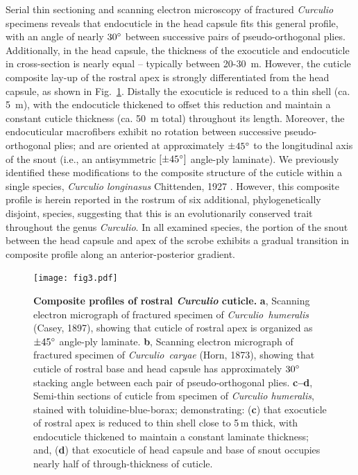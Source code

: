 \documentclass[twocolumn, linenumbers, superscriptaddress, nofootinbib]{revtex4-1}
\begin{document}
		Serial thin sectioning and scanning electron microscopy of fractured \textit{Curculio} specimens reveals that endocuticle in the head capsule fits this general profile, with an angle of nearly $30\degree$ between successive pairs of pseudo-orthogonal plies.
		Additionally, in the head capsule, the thickness of the exocuticle and endocuticle in cross-section is nearly equal -- typically between 20-30 \,{\textmu}m.
		However, the cuticle composite lay-up of the rostral apex is strongly differentiated from the head capsule, as shown in Fig.~\ref{fig::profile}.
		Distally the exocuticle is reduced to a thin shell (ca. 5 \,{\textmu}m), with the endocuticle thickened to offset this reduction and maintain a constant cuticle thickness (ca. 50 \,{\textmu}m total) throughout its length.
		Moreover, the endocuticular macrofibers exhibit no rotation between successive pseudo-orthogonal plies; and are oriented at approximately $\pm45\degree$ to the longitudinal axis of the snout (i.e., an antisymmetric $[\pm45\degree]$ angle-ply laminate).
		We previously identified these modifications to the composite structure of the cuticle within a single species, \textit{Curculio longinasus} Chittenden, 1927 \cite{Jansen2016, Singh2016}.
		However, this composite profile is herein reported in the rostrum of six additional, phylogenetically disjoint, species, suggesting that this is an evolutionarily conserved trait throughout the genus \textit{Curculio}.
		In all examined species, the portion of the snout between the head capsule and apex of the scrobe exhibits a gradual transition in composite profile along an anterior-posterior gradient.
		
		\begin{figure}
			\centering
			\texttt{[image: fig3.pdf]}
			\caption{\textbf{Composite profiles of rostral \textit{Curculio} cuticle.}
				\textbf{a}, Scanning electron micrograph of fractured specimen of \textit{Curculio~humeralis} (Casey, 1897), showing that cuticle of rostral apex is organized as $\pm45\degree$ angle-ply laminate.
				\textbf{b}, Scanning electron micrograph of fractured specimen of \textit{Curculio~caryae} (Horn, 1873), showing that cuticle of rostral base and head capsule has approximately $30\degree$ stacking angle between each pair of pseudo-orthogonal plies.
				\textbf{c--d}, Semi-thin sections of cuticle from specimen of \textit{Curculio humeralis}, stained with toluidine-blue-borax; demonstrating:
				(\textbf{c}) that exocuticle of rostral apex is reduced to thin shell close to 5\,{\textmu}m thick, with endocuticle thickened to maintain a constant laminate thickness; and, 
				(\textbf{d}) that exocuticle of head capsule and base of snout occupies nearly half of through-thickness of cuticle.
			}
			\label{fig::profile}
		\end{figure}
		
\end{document}
